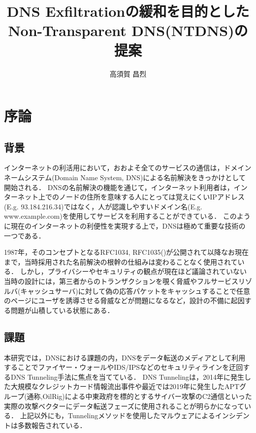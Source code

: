 \documentclass[12pt]{jarticle} %
\title{DNS Exfiltrationの緩和を目的としたNon-Transparent DNS(NTDNS)の提案}
\author{高須賀 昌烈}
\begin{document}
\titlepage
\cmemberspage
\firstabstract
\secondabstract



\toc
\newpage
\listoffigures
\listoftables



\newpage
{}
\section{序論}
\subsection{背景}
インターネットの利活用において，おおよそ全てのサービスの通信は，ドメインネームシステム(Domain Name System, DNS)による名前解決をきっかけとして開始される．
DNSの名前解決の機能を通じて，インターネット利用者は，インターネット上でのノードの住所を意味する人にとっては覚えにくいIPアドレス(E.g. 93.184.216.34)ではなく，人が認識しやすいドメイン名(E.g. www.example.com)を使用してサービスを利用することができている．
このように現在のインターネットの利便性を実現する上で，DNSは極めて重要な技術の一つである．

1987年，そのコンセプトとなるRFC1034, RFC1035(\cite{rfc1034, rfc1035})が公開されて以降なお現在まで，当時採用された名前解決の根幹の仕組みは変わることなく使用されている．
しかし，プライバシーやセキュリティの観点が現在ほど議論されていない当時の設計には，第三者からのトランザクションを覗く脅威やフルサービスリゾルバ(キャッシュサーバ)に対して偽の応答パケットをキャッシュすることで任意のページにユーザを誘導させる脅威などが問題になるなど，設計の不備に起因する問題が山積している状態にある．

\subsection{課題}
本研究では，DNSにおける課題の内，DNSをデータ転送のメディアとして利用することでファイヤー・ウォールやIDS/IPSなどのセキュリティラインを迂回するDNS Tunneling手法に焦点を当てている．
DNS Tunnelingは，2014年に発生した大規模なクレジットカード情報流出事件\cite{frameworkpos}や最近では2019年に発生したAPTグループ(通称,OilRig)による中東政府を標的とするサイバー攻撃のC2通信\cite{bondupdater}といった実際の攻撃ベクターにデータ転送フェーズに使用されることが明らかになっている．
上記以外にも，Tunnelingメソッドを使用したマルウェアによるインシデントは多数報告されている\cite{bernhardpos, multigrainpos, pisloader, denis, dnsmessenger, udpos}．
\end{document}

